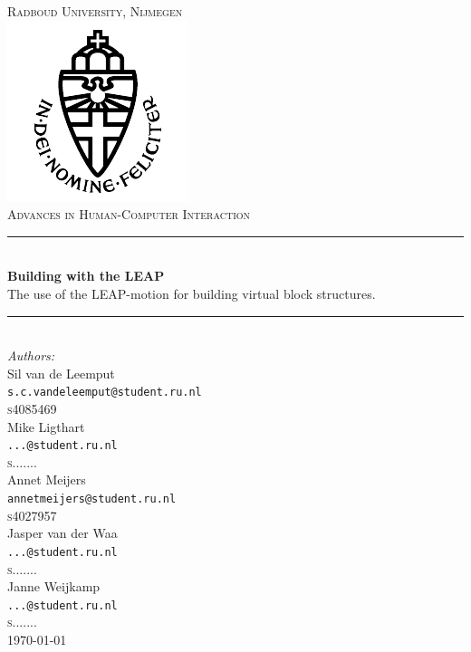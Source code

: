 \newcommand{\HRule}{\rule{\linewidth}{0.5mm}}

\begin{titlepage}

\begin{center}



\textsc{\LARGE Radboud University, Nijmegen}\\

\includegraphics[scale=0.8]{imgs/rulogo.png}\\[1cm]

\textsc{\Large Advances in Human-Computer Interaction}\\[0.5cm]



\HRule \\[0.4cm]
{ \huge \bfseries Building with the LEAP}\\[0.3cm]
{\Large The use of the LEAP-motion for building virtual block structures.}

\HRule \\[1cm]

{\large \emph{Authors:}\\[0.2cm]
Sil van de Leemput\\
\texttt{s.c.vandeleemput@student.ru.nl}\\[0.08cm]
\textsc{s4085469}\\[0.5cm]
Mike Ligthart\\
\texttt{...@student.ru.nl}\\[0.08cm]
\textsc{s.......}\\[0.5cm]
Annet Meijers\\
\texttt{annetmeijers@student.ru.nl}\\[0.08cm]
\textsc{s4027957}\\[0.5cm]
Jasper van der Waa\\
\texttt{...@student.ru.nl}\\[0.08cm]
\textsc{s.......}\\[0.5cm]
Janne Weijkamp\\
\texttt{...@student.ru.nl}\\[0.08cm]
\textsc{s.......}}\\[2cm]
\today
\end{center}

\end{titlepage}